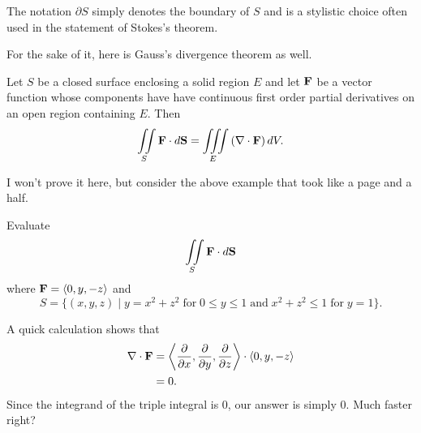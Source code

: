 \begin{remark}
    The notation $\partial S$ simply denotes the boundary of $S$ and is a stylistic choice often used in the statement of Stokes's theorem.
\end{remark}

For the sake of it, here is Gauss's divergence theorem as well.

\begin{theorem}
    Let $S$ be a closed surface enclosing a solid region $E$ and let $\mathbf{F}$ be a vector function whose components have have continuous first order partial derivatives on an open region containing $E$. Then
    \[\iint\limits_{S} \mathbf{F} \cdot d\mathbf{S} = \iiint\limits_{E}\left(\nabla \cdot \mathbf{F}\right)dV.\]
\end{theorem}

I won't prove it here, but consider the above example that took like a page and a half.

\begin{example}
    Evaluate
    \[\iint\limits_{S}\mathbf{F} \cdot d\mathbf{S}\]
    where $\mathbf{F} = \left<0, y, -z\right>$ and
    \[S = \{(x, y, z) \mid y = x^{2} + z^{2} \; \text{for} \; 0 \leq y \leq 1 \; \text{and} \; x^{2} + z^{2} \leq 1 \; \text{for} \; y = 1\}.\]

    \begin{soln}
        A quick calculation shows that
        \begin{align*}
            \nabla \cdot \mathbf{F} &= \left<\frac{\partial}{\partial x}, \frac{\partial}{\partial y}, \frac{\partial}{\partial z}\right> \cdot \left<0, y, -z\right> \\
            &= 0.
        \end{align*}
        Since the integrand of the triple integral is $0$, our answer is simply $\boxed{0}$. Much faster right?
    \end{soln}
\end{example}